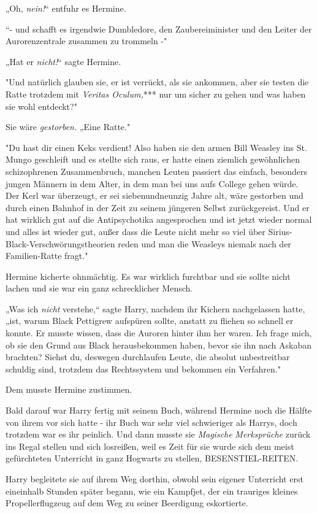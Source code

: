 {„Oh, \emph{nein!}“ entfuhr es Hermine.

“- und schafft es irgendwie Dumbledore, den Zaubereiminister und den Leiter der Aurorenzentrale zusammen zu trommeln -"

„Hat er \emph{nicht!}“ sagte Hermine.

"Und natürlich glauben sie, er ist verrückt, als sie ankommen, aber sie testen die Ratte trotzdem mit \emph{Veritas Oculum,}*** nur um sicher zu gehen und was haben sie wohl entdeckt?"

Sie wäre \emph{gestorben.} „Eine Ratte."

"Du hast dir einen Keks verdient! Also haben sie den armen Bill Weasley ins St. Mungo geschleift und es stellte sich raus, er hatte einen ziemlich gewöhnlichen schizophrenen Zusammenbruch, manchen Leuten passiert das einfach, besonders jungen Männern in dem Alter, in dem man bei uns aufs College gehen würde. Der Kerl war überzeugt, er sei siebenundneunzig Jahre alt, wäre gestorben und durch einen Bahnhof in der Zeit zu seinem jüngeren Selbst zurückgereist. Und er hat wirklich gut auf die Antipsychotika angesprochen und ist jetzt wieder normal und alles ist wieder gut, außer dass die Leute nicht mehr so viel über Sirius-Black-Verschwörungstheorien reden und man die Weasleys niemals nach der Familien-Ratte fragt."

Hermine kicherte ohnmächtig. Es war wirklich furchtbar und sie sollte nicht lachen und sie war ein ganz schrecklicher Mensch.

„Was ich \emph{nicht} verstehe,“ sagte Harry, nachdem ihr Kichern nachgelassen hatte, „ist, warum Black Pettigrew aufspüren sollte, anstatt zu fliehen so schnell er konnte. Er musste wissen, dass die Auroren hinter ihm her waren. Ich frage mich, ob sie den Grund aus Black herausbekommen haben, bevor sie ihn nach Askaban brachten? Siehst du, deswegen durchlaufen Leute, die absolut unbestreitbar schuldig sind, trotzdem das Rechtssystem und bekommen ein Verfahren."

Dem musste Hermine zustimmen.

Bald darauf war Harry fertig mit seinem Buch, während Hermine noch die Hälfte von ihrem vor sich hatte - ihr Buch war sehr viel schwieriger als Harrys, doch trotzdem war es ihr peinlich. Und dann musste sie \emph{Magische} \emph{Merksprüche} zurück ins Regal stellen und sich losreißen, weil es Zeit für sie wurde sich dem meist gefürchteten Unterricht in ganz Hogwarts zu stellen, BESENSTIEL-REITEN.

Harry begleitete sie auf ihrem Weg dorthin, obwohl sein eigener Unterricht erst eineinhalb Stunden später begann, wie ein Kampfjet, der ein trauriges kleines Propellerflugzeug auf dem Weg zu seiner Beerdigung eskortierte.

}
